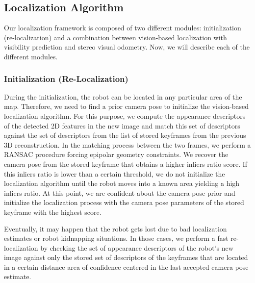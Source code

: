 \subsection{Localization Algorithm}\label{sec:localization_algorithm}
Our localization framework is composed of two different modules:
initialization (re-localization) and a combination between
vision-based localization with visibility prediction and stereo visual
odometry. Now, we will describe each of the different modules.

\subsubsection{Initialization (Re-Localization)}
During the initialization, the robot can be located in any particular
area of the map. Therefore, we need to find a prior camera pose to
initialize the vision-based localization algorithm. For this purpose,
we compute the appearance descriptors of the detected 2D features in
the new image and match this set of descriptors against the set of
descriptors from the list of stored keyframes from the previous 3D
reconstruction. In the matching process between the two frames, we
perform a RANSAC procedure forcing epipolar geometry constraints. We
recover the camera pose from the stored keyframe that obtains a higher
inliers ratio score. If this inliers ratio is lower than a certain
threshold, we do not initialize the localization algorithm until the
robot moves into a known area yielding a high inliers ratio. At this
point, we are confident about the camera pose prior and initialize the
localization process with the camera pose parameters of the stored
keyframe with the highest score.

Eventually, it may happen that the robot gets lost due to bad
localization estimates or robot kidnapping situations. In those cases,
we perform a fast re-localization by checking the set of appearance
descriptors of the robot's new image against only the stored set of
descriptors of the keyframes that are located in a certain distance
area of confidence centered in the last accepted camera pose estimate.

